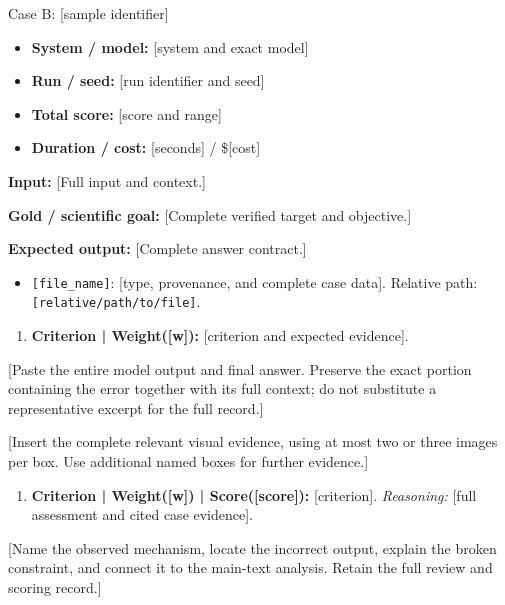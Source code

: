 \begin{ReportCaseBox}{Case B: [sample identifier]}
\begin{itemize}
\item \textbf{System / model:} [system and exact model]
\item \textbf{Run / seed:} [run identifier and seed]
\item \textbf{Total score:} [score and range]
\item \textbf{Duration / cost:} [seconds] / \$[cost]
\end{itemize}

\textbf{Input:} [Full input and context.]\par
\textbf{Gold / scientific goal:} [Complete verified target and objective.]\par
\textbf{Expected output:} [Complete answer contract.]\par

\begin{itemize}
\item \texttt{[file\_name]}: [type, provenance, and complete case data]. Relative path: \texttt{[relative/path/to/file]}.
\end{itemize}

\begin{enumerate}
\item \textbf{Criterion | Weight([w]):} [criterion and expected evidence].
\end{enumerate}

[Paste the entire model output and final answer. Preserve the exact portion containing the error together with its full context; do not substitute a representative excerpt for the full record.]

[Insert the complete relevant visual evidence, using at most two or three images per box. Use additional named boxes for further evidence.]

\begin{enumerate}
\item \textbf{Criterion | Weight([w]) | Score([score]):} [criterion]. \emph{Reasoning:} [full assessment and cited case evidence].
\end{enumerate}

[Name the observed mechanism, locate the incorrect output, explain the broken constraint, and connect it to the main-text analysis. Retain the full review and scoring record.]
\end{ReportCaseBox}

